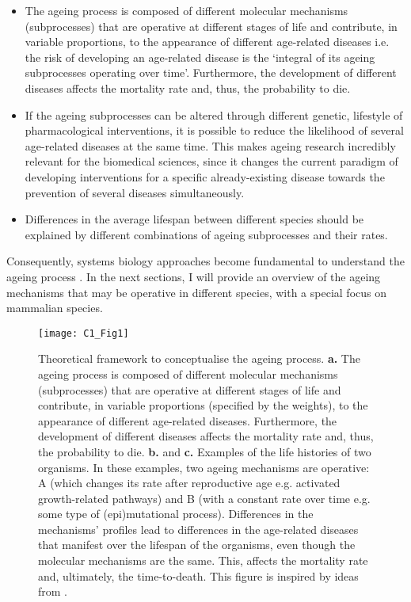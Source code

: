 \begin{itemize}
	
	\item The ageing process is composed of different molecular mechanisms (subprocesses) that are operative at different stages of life and contribute, in variable proportions, to the appearance of different age-related diseases i.e. the risk of developing an age-related disease is the `integral of its ageing subprocesses operating over time'. Furthermore, the development of different diseases affects the mortality rate and, thus, the probability to die.
	
	\item If the ageing subprocesses can be altered through different genetic, lifestyle of pharmacological interventions, it is possible to reduce the likelihood of several age-related diseases at the same time. This makes ageing research incredibly relevant for the biomedical sciences, since it changes the current paradigm of developing interventions for a specific already-existing disease towards the prevention of several diseases simultaneously.
	
	\item  Differences in the average lifespan between different species should be explained by different combinations of ageing subprocesses and their rates.
		
\end{itemize}	

Consequently, systems biology approaches become fundamental to understand the ageing process \cite{Freund2019}. In the next sections, I will provide an overview of the ageing mechanisms that may be operative in different species, with a special focus on mammalian species. 

\begin{figure}[htbp!] 
	\centering    
	\texttt{[image: C1\_Fig1]}
	\vspace*{1 mm}
	\caption[Theoretical framework to conceptualise the ageing process]{Theoretical framework to conceptualise the ageing process. \textbf{a.} The ageing process is composed of different molecular mechanisms (subprocesses) that are operative at different stages of life and contribute, in variable proportions (specified by the weights), to the appearance of different age-related diseases. Furthermore, the development of different diseases affects the mortality rate and, thus, the probability to die. \textbf{b.} and \textbf{c.} Examples of the life histories of two organisms. In these examples, two ageing mechanisms are operative: A (which changes its rate after reproductive age e.g. activated growth-related pathways) and B (with a constant rate over time e.g. some type of (epi)mutational process). Differences in the mechanisms' profiles lead to differences in the age-related diseases that manifest over the lifespan of the organisms, even though the molecular mechanisms are the same. This, affects the mortality rate and, ultimately, the time-to-death. This figure is inspired by ideas from \cite{Hayflick2007,Gems2015,Peto1997,Freund2019}.}
	\label{fig:c1_fig1}
\end{figure}

